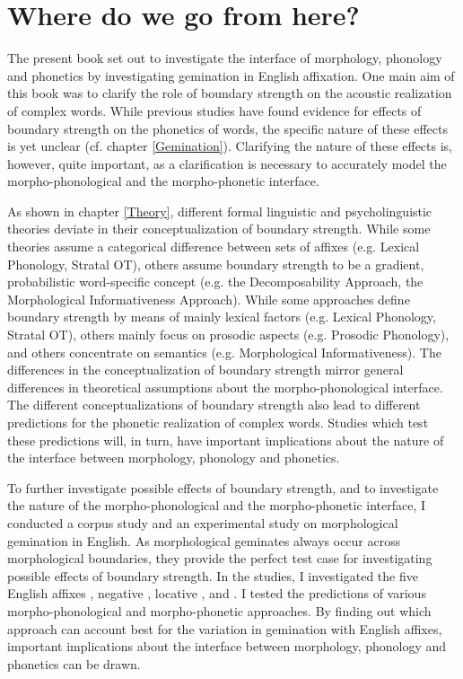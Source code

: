 \chapter{Where do we go from here?} \label{final conclusion}

The present book set out to investigate the interface of morphology, phonology and phonetics by investigating gemination in English affixation. 
One main aim of this book was to clarify the role of boundary strength on the acoustic realization of complex words. 
While previous studies have found evidence for effects of boundary strength on the phonetics of words, the specific nature of these effects is yet unclear (cf. chapter \ref{Gemination}). 
 Clarifying the nature of these effects is, however, quite important, as a clarification is necessary to accurately model the morpho-phonological and the morpho-phonetic interface. 

As shown in chapter \ref{Theory}, different formal linguistic and psycholinguistic theories deviate in their conceptualization of  boundary strength. While some theories assume a categorical difference between sets of affixes (e.g. Lexical Phonology, Stratal OT), others assume boundary strength to be a gradient, probabilistic word-specific concept (e.g. the Decomposability Approach, the Morphological Informativeness Approach). 
While some approaches define boundary strength by means of mainly lexical factors (e.g. Lexical Phonology, Stratal OT), others mainly focus on prosodic aspects (e.g. Prosodic Phonology), and others concentrate on semantics (e.g. Morphological Informativeness).  The differences in the conceptualization of boundary strength mirror general differences in theoretical assumptions about the morpho-phonological interface. %
 The different conceptualizations of boundary strength also lead to different predictions for the phonetic realization of complex words.
 Studies which test these predictions will, in turn, have important implications about the nature of the interface between morphology, phonology and phonetics.
 
To further investigate possible effects of boundary strength, and to investigate the nature of the morpho-phonological and the morpho-phonetic interface, I conducted a corpus study and an experimental study on morphological gemination in English.  As morphological geminates always occur across morphological boundaries, they provide the perfect test case for investigating possible effects of boundary strength. 
 In the studies, I investigated the five English affixes , negative , locative ,  and . I tested the predictions of various morpho-phonological and morpho-phonetic approaches. By finding out which approach can account best for the variation in gemination with English affixes, important implications about the interface between morphology, phonology and phonetics can be drawn.




